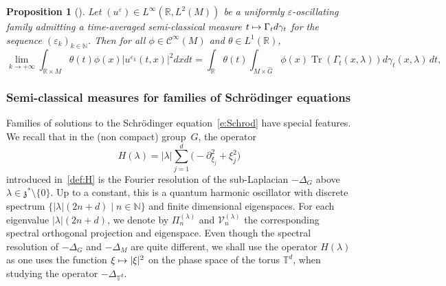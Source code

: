 \documentclass[JEP,XML,SOM,Unicode,published]{cedram}
\let\mathcal\mathscr
\newcommand\mto{\mathchoice{\longmapsto}{\mapsto}{\mapsto}{\mapsto}}
\let\sep\mid
\DeclareMathOperator{\Tr}{Tr}
\theoremstyle{plain}
\newtheorem{proposition}[theorem]{Proposition}
\theoremstyle{definition}
\let\eps\varepsilon
\def\R{{\mathbb R}}
\def\N{{\mathbb N}}
\def\T{{\mathbb T}}
\begin{document}
\begin{proposition}[{\cite[Prop.\,5.3]{FF}}]
\label{prop:eops}
Let $(u^\eps)\!\in\!L^\infty(\R, L^2(M))$ be a uniformly $\eps$\nobreakdash-oscil\-lating family admitting a time-averaged semi-classical measure $t\mto \Gamma_t d\gamma_t$ for the sequence $(\eps_k)_{k\in \N}$. Then
for all
$\phi\in{\mathcal C}^\infty (M)$ and $\theta\in L^1(\R)$,
\[
\lim_{k\to +\infty} \int_{\R\times M} \theta(t) \phi(x) |u^{\eps_k}(t,x)|^2 dxdt
=\int_{\R} \theta(t)
\int_{M\times \widehat G}
\phi(x) \Tr \left(\Gamma_t(x,\lambda) \right) d\gamma_t(x,\lambda) \, dt,
\]
\end{proposition}

\subsubsection{Semi-classical measures for families of Schrödinger equations}

Families of solu\-tions to the Schrödinger equation~\eqref{e:Schrod} have special features. We recall that in the (non compact) group~$G$, the operator
\[
H(\lambda)=|\lambda| \sum_{j=1}^{d} \bigl(-\partial_{\xi_j}^2+\xi_j^2\bigr)
\]
introduced in~\eqref{def:H} is the Fourier resolution of the sub-Laplacian $-\Delta_G$ above $\lambda\in \mathfrak z^*\setminus \{0\}$.
Up to a constant, this is a quantum harmonic oscillator with
discrete spectrum $\{|\lambda|(2n+d)\sep n\in \N\}$
and finite dimensional eigenspaces.
For each eigenvalue \hbox{$|\lambda|(2n+d)$}, we denote by
$
\Pi_n^{(\lambda)}$ and
$\mathcal V^{(\lambda)}_n
$
the corresponding spectral orthogonal projection and eigenspace.
Even though the spectral resolution of $-\Delta_G$ and $-\Delta_M$ are quite different, we shall use the operator $H(\lambda)$ as one uses the function $\xi\mto |\xi|^2$ on the phase space of the torus $\T^d$, when studying the operator $-\Delta_{\T^d}$.
\end{document}
